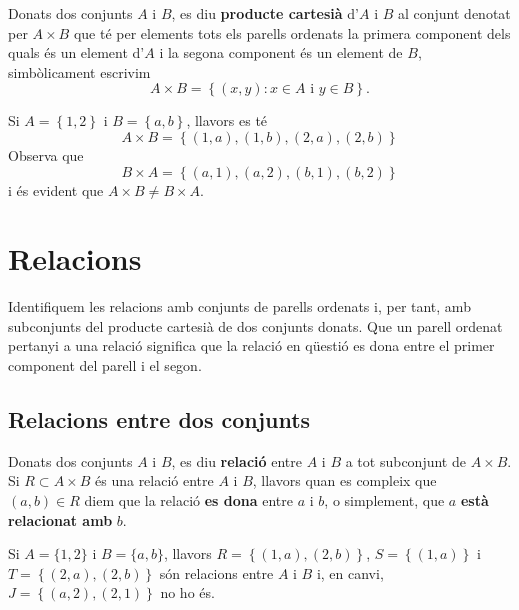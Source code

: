 \bigskip

Donats dos conjunts $A$ i $B$, es diu \textbf{producte cartesià} d'$A$ i
$B$ al conjunt denotat per $A\times B$ que té per elements tots els
parells ordenats la primera component dels quals és un element d'$A$ i
la segona component és un element de $B$, simbòlicament escrivim
\begin{equation*}
A\times B=\left\{ (x,y):x\in A\text{ i }y\in B\right\} \text{.}
\end{equation*}

\begin{exemple}
Si $A=\left\{ 1,2\right\} $ i $B=\left\{ a,b\right\} $, llavors es té%
\begin{equation*}
A\times B=\left\{ (1,a),(1,b),(2,a),(2,b)\right\}
\end{equation*}
Observa que%
\begin{equation*}
B\times A=\left\{ (a,1),(a,2),(b,1),(b,2)\right\}
\end{equation*}
i és evident que $A\times B\neq B\times A$.
\end{exemple}

\section{Relacions}

Identifiquem les relacions amb conjunts de parells ordenats i, per tant, amb
subconjunts del producte cartesià de dos conjunts donats. Que un parell
ordenat pertanyi a una relació significa que la relació en qüestió es dona entre el primer component del parell i el segon.

\subsection{Relacions entre dos conjunts}

Donats dos conjunts $A$ i $B$, es diu \textbf{relació} entre $A$ i $B$ a
tot subconjunt de $A\times B$. Si $R\subset A\times B$ és una relació
entre $A$ i $B$, llavors quan es compleix que $(a,b)\in R$ diem que la relació \textbf{es dona} entre $a$ i $b$, o simplement, que $a$ \textbf{està relacionat amb} $b$.

\begin{exemple}
Si $A=\{1,2\}$ i $B=\{a,b\}$, llavors $R=\left\{ (1,a),(2,b)\right\} $, $%
S=\left\{ (1,a)\right\} $ i $T=\left\{ (2,a),(2,b)\right\} $ són
relacions entre $A$ i $B$ i, en canvi, $J=\left\{ (a,2),(2,1)\right\} $ no
ho és.
\end{exemple}


